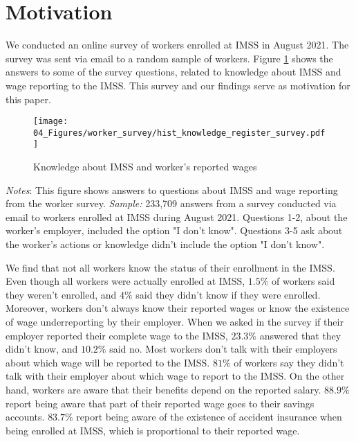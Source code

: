 \documentclass[10pt, oneside]{book}
\begin{document}
\normalsize



\section{Motivation}

We conducted an online survey of workers enrolled at IMSS in August 2021. The survey was sent via email to a random sample of workers. Figure \ref{fig:hist_knowledge_register_survey} shows the answers to some of the survey questions, related to knowledge about IMSS and wage reporting to the IMSS. This survey and our findings serve as motivation for this paper. \\

\begin{figure}[H]
    \centering
    \caption{Knowledge about IMSS and worker's reported wages \label{fig:hist_knowledge_register_survey}}
    \texttt{[image: 04\_Figures/worker\_survey/hist\_knowledge\_register\_survey.pdf]}
\end{figure}
\scriptsize{\textit{Notes}: This figure shows answers to questions about IMSS and wage reporting from the worker survey. \textit{Sample:} 233,709 answers from a survey conducted via email to workers enrolled at IMSS during August 2021. Questions 1-2, about the worker's employer, included the option "I don't know". Questions 3-5 ask about the worker's actions or knowledge didn't include the option "I don't know".
} \\

\normalsize

We find that not all workers know the status of their enrollment in the IMSS. Even though all workers were actually enrolled at IMSS, $1.5\%$ of workers said they weren't enrolled, and $4\%$ said they didn't know if they were enrolled. Moreover, workers don't always know their reported wages or know the existence of wage underreporting by their employer. When we asked in the survey if their employer reported their complete wage to the IMSS, $23.3\%$ answered that they didn't know, and $10.2\%$ said no. Most workers don't talk with their employers about which wage will be reported to the IMSS. $81\%$ of workers say they didn't talk with their employer about which wage to report to the IMSS. On the other hand, workers are aware that their benefits depend on the reported salary. $88.9\%$ report being aware that part of their reported wage goes to their savings accounts. $83.7\%$ report being aware of the existence of accident insurance when being enrolled at IMSS, which is proportional to their reported wage. \\
\end{document}
